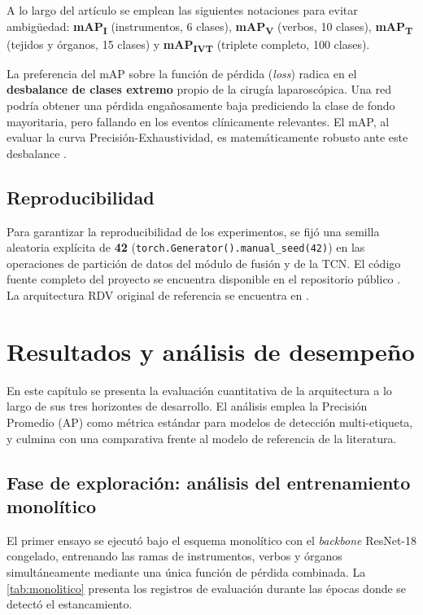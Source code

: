 \documentclass[11pt]{article}
\begin{document}
A lo largo del artículo se emplean las siguientes notaciones para evitar ambigüedad: \textbf{mAP\textsubscript{I}} (instrumentos, 6 clases), \textbf{mAP\textsubscript{V}} (verbos, 10 clases), \textbf{mAP\textsubscript{T}} (tejidos y órganos, 15 clases) y \textbf{mAP\textsubscript{IVT}} (triplete completo, 100 clases).

La preferencia del mAP sobre la función de pérdida (\emph{loss}) radica en el \textbf{desbalance de clases extremo} propio de la cirugía laparoscópica. Una red podría obtener una pérdida engañosamente baja prediciendo la clase de fondo mayoritaria, pero fallando en los eventos clínicamente relevantes. El mAP, al evaluar la curva Precisión-Exhaustividad, es matemáticamente robusto ante este desbalance \cite{nwoye2023cholectriplet}.

\subsection{Reproducibilidad}
\label{sec:reproducibilidad}

Para garantizar la reproducibilidad de los experimentos, se fijó una semilla aleatoria explícita de \textbf{42} (\texttt{torch.Generator().manual\_seed(42)}) en las operaciones de partición de datos del módulo de fusión y de la TCN. El código fuente completo del proyecto se encuentra disponible en el repositorio público \cite{ortiz2026github}. La arquitectura RDV original de referencia se encuentra en \cite{camma2022github}.

\section{Resultados y análisis de desempeño}
\label{sec:resultados}

En este capítulo se presenta la evaluación cuantitativa de la arquitectura a lo largo de sus tres horizontes de desarrollo. El análisis emplea la Precisión Promedio (AP) como métrica estándar para modelos de detección multi-etiqueta, y culmina con una comparativa frente al modelo de referencia de la literatura.

\subsection{Fase de exploración: análisis del entrenamiento monolítico}
\label{sec:resultados-monolitico}

El primer ensayo se ejecutó bajo el esquema monolítico con el \emph{backbone} ResNet-18 congelado, entrenando las ramas de instrumentos, verbos y órganos simultáneamente mediante una única función de pérdida combinada. La \cref{tab:monolitico} presenta los registros de evaluación durante las épocas donde se detectó el estancamiento.
\end{document}
